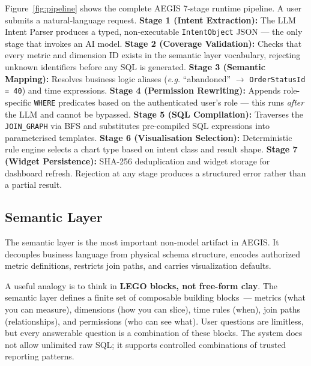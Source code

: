 \documentclass[11pt]{article}
\begin{document}
Figure~\ref{fig:pipeline} shows the complete AEGIS 7-stage runtime pipeline. A user submits a natural‑language request. \textbf{Stage 1 (Intent Extraction):} The LLM Intent Parser produces a typed, non‑executable \texttt{IntentObject} JSON --- the only stage that invokes an AI model. \textbf{Stage 2 (Coverage Validation):} Checks that every metric and dimension ID exists in the semantic layer vocabulary, rejecting unknown identifiers before any SQL is generated. \textbf{Stage 3 (Semantic Mapping):} Resolves business logic aliases (\textit{e.g.} ``abandoned'' $\rightarrow$ \texttt{OrderStatusId = 40}) and time expressions. \textbf{Stage 4 (Permission Rewriting):} Appends role-specific \texttt{WHERE} predicates based on the authenticated user's role --- this runs \emph{after} the LLM and cannot be bypassed. \textbf{Stage 5 (SQL Compilation):} Traverses the \texttt{JOIN\_GRAPH} via BFS and substitutes pre-compiled SQL expressions into parameterised templates. \textbf{Stage 6 (Visualisation Selection):} Deterministic rule engine selects a chart type based on intent class and result shape. \textbf{Stage 7 (Widget Persistence):} SHA-256 deduplication and widget storage for dashboard refresh. Rejection at any stage produces a structured error rather than a partial result.

\subsection{Semantic Layer}
The semantic layer is the most important non‑model artifact in AEGIS. It decouples business language from physical schema structure, encodes authorized metric definitions, restricts join paths, and carries visualization defaults.

A useful analogy is to think in \textbf{LEGO blocks, not free-form clay}. The semantic layer defines a finite set of composable building blocks~--- metrics (what you can measure), dimensions (how you can slice), time rules (when), join paths (relationships), and permissions (who can see what). User questions are limitless, but every answerable question is a combination of these blocks. The system does not allow unlimited raw SQL; it supports controlled combinations of trusted reporting patterns.
\end{document}

